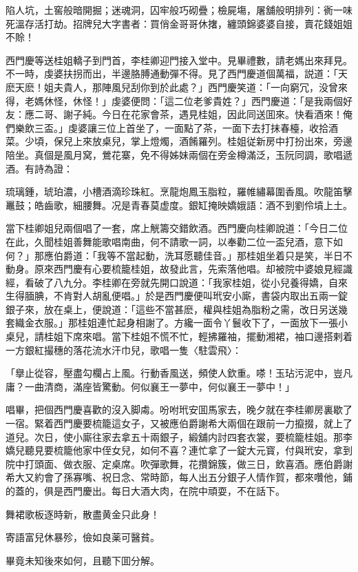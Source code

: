 \begin{myquote}
陷人坑，土窖般暗開掘；迷魂洞，囚牢般巧砌疊；檢屍塲，屠舖般明排列：衠一味死溫存活打劫。招牌兒大字書者：買俏金哥哥休撦，纏頭錦婆婆自接，賣花錢姐姐不賒！
\end{myquote}

西門慶等送桂姐轎子到門首，李桂卿迎門接入堂中。見畢禮數，請老媽出來拜見。不一時，虔婆扶拐而出，半邊胳膊通動彈不得。見了西門慶道個萬福，説道：「天麽天麽！姐夫貴人，那陣風兒刮你到於此處？」西門慶笑道：「一向窮冗，没曾來得，老媽休怪，休怪！」虔婆便問：「這二位老爹貴姓？」西門慶道：「是我兩個好友：應二哥、謝子純。今日在花家會茶，遇見桂姐，因此同送囬來。快看酒來！俺們樂飲三盃。」虔婆讓三位上首坐了，一面點了茶，一面下去打抹春檯，收拾酒菜。少頃，保兒上來放桌兒，掌上燈燭，酒餚羅列。桂姐従新房中打扮出來，旁邊陪坐。真個是風月窝，鶯花寨，免不得姊妹兩個在旁金樽滿泛，玉阮同調，歌唱遞酒。有詩為證：

\begin{myquote}
琉璃鍾，琥珀濃，小槽酒滴珍珠紅。烹龍炮鳳玉脂粒，羅帷繡幕圍香風。吹龍笛擊鼉鼓；皓齒歌，細腰舞。况是青春莫虚度。銀缸掩映嬌娥語：酒不到劉伶墳上土。
\end{myquote}

當下桂卿姐兒兩個唱了一套，席上觥籌交錯飲酒。西門慶向桂卿說道：「今日二位在此，久聞桂姐善舞能歌唱南曲，何不請歌一詞，以奉勸二位一盃兒酒，意下如何？」那應伯爵道：「我等不當起動，洗耳愿聽佳音。」那桂姐坐着只是笑，半日不動身。原來西門慶有心要梳籠桂姐，故發此言，先索落他唱。却被院中婆娘見經識經，看破了八九分。李桂卿在旁就先開口說道：「我家桂姐，從小兒養得嬌，自來生得腼腆，不肯對人胡亂便唱。」於是西門慶便叫玳安小廝，書袋内取出五兩一錠銀子來，放在桌上，便說道：「這些不當甚麽，權與桂姐為脂粉之需，改日另送幾套織金衣服。」那桂姐連忙起身相謝了。方纔一面令丫鬟收下了，一面放下一張小桌兒，請桂姐下席來唱。當下桂姐不慌不忙，輕拂羅袖，擺動湘裙，袖口邊搭剌着一方銀紅撮穗的落花流水汗巾兒，歌唱一隻〈駐雲飛〉：

\begin{myquote}
「擧止從容，壓盡勾欄占上風。行動香風送，頻使人欽重。嗏！玉玷污泥中，豈凡庸？一曲清商，滿座皆驚動。何似襄王一夢中，何似襄王一夢中！」
\end{myquote}

唱畢，把個西門慶喜歡的沒入脚䖏。吩咐玳安囬馬家去，晚夕就在李桂卿房裏歇了一宿。緊着西門慶要梳籠這女子，又被應伯爵謝希大兩個在跟前一力攛掇，就上了道兒。次日，使小廝往家去拿五十兩銀子，緞舖内討四套衣裳，要梳籠桂姐。那李嬌兒聽見要梳籠他家中侄女兒，如何不喜？連忙拿了一錠大元寳，付與玳安，拿到院中打頭面、做衣服、定桌席。吹彈歌舞，花攢錦簇，做三日，飲喜酒。應伯爵謝希大又約會了孫寡嘴、祝日念、常時節，每人出五分銀子人情作賀，都來囋他，鋪的蓋的，俱是西門慶出。每日大酒大肉，在院中頑耍，不在話下。

\begin{myquote}
舞裙歌板逐時新，散盡黄金只此身！

寄語富兒休暴殄，儉如良薬可醫貧。
\end{myquote}

畢竟未知後來如何，且聽下囬分解。

